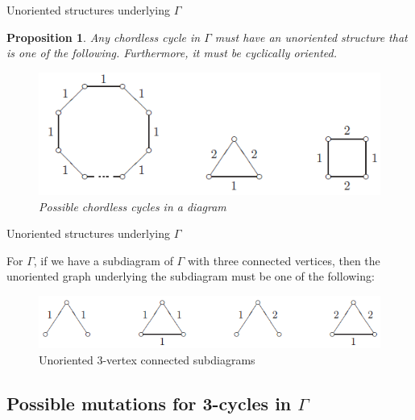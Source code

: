 \documentclass{beamer}
\newtheorem{proposition}{Proposition}
\begin{document}
\begin{frame}{Unoriented structures underlying $\Gamma$}
\begin{proposition}
Any chordless cycle in $\Gamma$ must have an unoriented structure that is one of the following. Furthermore, it must be cyclically oriented.
\begin{figure}[h]
\centering
\includegraphics[scale = .65]{chordlesscycles.PNG}
\caption{Possible chordless cycles in a diagram}
\end{figure}

\end{proposition}
\end{frame}

\begin{frame}{Unoriented structures underlying $\Gamma$}
\begin{lemma}
For $\Gamma$, if we have a subdiagram of $\Gamma$ with three connected vertices, then the unoriented graph underlying the subdiagram must be one of the following:
\begin{figure}[h]
\centering
\includegraphics[scale = .65]{3vertconnected.PNG}
\caption{Unoriented 3-vertex connected subdiagrams}
\end{figure}
\end{lemma}

\end{frame}

\subsection{Possible mutations for 3-cycles in $\Gamma$}
\end{document}
